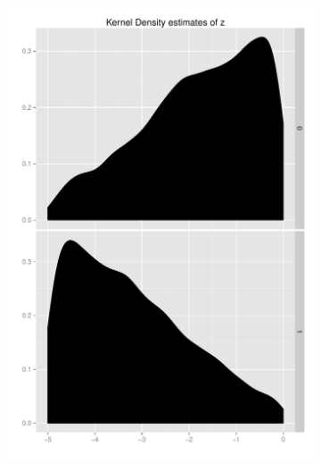 \documentclass[11pt,letterpaper]{article}
\begin{document}
\begin{figure}[h]
	\begin{subfigure}[b]{0.3\textwidth}\centering \includegraphics[width=1\textwidth]{z}  \end{subfigure}

\end{figure}
\end{document}
